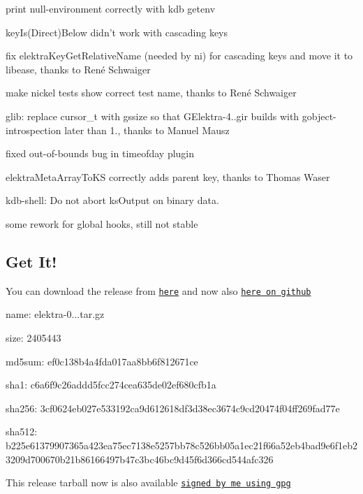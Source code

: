 \begin{DoxyItemize}
\item print null-\/environment correctly with {\ttfamily kdb getenv}
\item key\+Is(\+Direct)Below didn't work with cascading keys
\item fix elektra\+Key\+Get\+Relative\+Name (needed by ni) for cascading keys and move it to libease, thanks to René Schwaiger
\item make nickel tests show correct test name, thanks to René Schwaiger
\item glib\+: replace cursor\+\_\+t with gssize so that G\+Elektra-\/4..\+gir builds with gobject-\/introspection later than 1., thanks to Manuel Mausz
\item fixed out-\/of-\/bounds bug in timeofday plugin
\item elektra\+Meta\+Array\+To\+K\+S correctly adds parent key, thanks to Thomas Waser
\item kdb-\/shell\+: Do not abort ks\+Output on binary data.
\item some rework for global hooks, still not stable
\end{DoxyItemize}

\subsection*{Get It!}

You can download the release from \href{http://www.libelektra.org/ftp/elektra/releases/elektra-0.8.16.tar.gz}{\tt here} and now also \href{https://github.com/ElektraInitiative/ftp/tree/master/releases/elektra-0.8.16.tar.gz}{\tt here on github}


\begin{DoxyItemize}
\item name\+: elektra-\/0...\+tar.\+gz
\item size\+: 2405443
\item md5sum\+: ef0c138b4a4fda017aa8bb6f812671ce
\item sha1\+: c6a6f9c26addd5fcc274cea635de02ef680cfb1a
\item sha256\+: 3cf0624eb027e533192ca9d612618df3d38ec3674c9cd20474f04ff269fad77e
\item sha512\+: b225e61379907365a423ea75ec7138e5257bb78c526bb05a1ec21f66a52eb4bad9e6f1eb23209d700670b21b86166497b47c3bc46bc9d45f6d366cd544afc326
\end{DoxyItemize}

This release tarball now is also available \href{http://www.libelektra.org/ftp/elektra/releases/elektra-0.8.16.tar.gz.gpg}{\tt signed by me using gpg}

